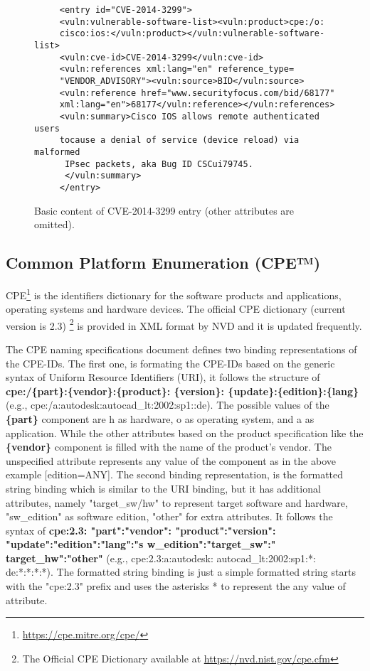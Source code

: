 \documentclass{llncs}
\begin{document}
 \begin{figure}
   
      \lstset{language=XML}
       \begin{lstlisting}
     <entry id="CVE-2014-3299">
     <vuln:vulnerable-software-list><vuln:product>cpe:/o:
     cisco:ios:</vuln:product></vuln:vulnerable-software-list>
     <vuln:cve-id>CVE-2014-3299</vuln:cve-id>
     <vuln:references xml:lang="en" reference_type=
     "VENDOR_ADVISORY"><vuln:source>BID</vuln:source>
     <vuln:reference href="www.securityfocus.com/bid/68177"
     xml:lang="en">68177</vuln:reference></vuln:references>
     <vuln:summary>Cisco IOS allows remote authenticated users 
     tocause a denial of service (device reload) via malformed
      IPsec packets, aka Bug ID CSCui79745.
      </vuln:summary>
     </entry>
       \end{lstlisting}
      \caption{Basic content of CVE-2014-3299 entry (other attributes are omitted).}
       \end{figure}
 
 \subsection{Common Platform Enumeration (CPE™)}
 CPE\footnote{\url{https://cpe.mitre.org/cpe/}} is the identifiers dictionary for the software products and applications, operating systems and hardware devices. The official CPE dictionary (current version is 2.3) \footnote{The Official CPE Dictionary available at \url{https://nvd.nist.gov/cpe.cfm}} is provided in XML format by NVD and it is updated frequently.
 \par The CPE naming specifications document \cite{cpe} defines two binding representations of the CPE-IDs. The first one, is formating the CPE-IDs based on the generic syntax of Uniform Resource Identifiers (URI), it follows the structure of \textbf{cpe:/\{part\}:\{vendor\}:\{product\}:
 \{version\}:
 \{update\}:\{edition\}:\{lang\}} (e.g., cpe:/a:autodesk:autocad\_lt:2002:sp1::de). The possible values of the \textbf{\{part\}} component are  h as hardware, o as operating system, and a as application. While the other attributes based on the product specification like the \textbf{\{vendor\}} component is filled with the name of the product's vendor. The unspecified attribute represents any value of the component as in the above example [edition=ANY]. 
 The second binding representation, is the  formatted string binding  which is similar to the URI binding, but it has additional attributes, namely "target\_sw/hw" to represent target software and hardware, "sw\_edition" as software edition, "other" for extra attributes. It follows the syntax of  \textbf{cpe:2.3: "part":"vendor":
 "product":"version":
  "update":"edition":"lang":"s \newline w\_edition":"target\_sw":"
   target\_hw":"other"} (e.g., cpe:2.3:a:autodesk:
   autocad\_lt:2002:sp1:*:
   de:*:*:*:*). The formatted string binding is just a simple formatted string starts with the  "cpe:2.3" prefix and uses the asterisks * to represent the any value of attribute. 
  
\end{document}
